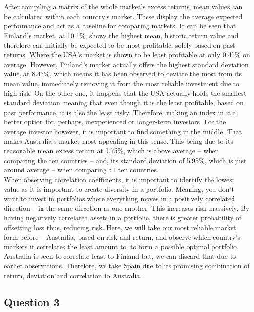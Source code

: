 \documentclass[11pt, english]{article}
\begin{document}
	After compiling a matrix of the whole market's excess returns, mean values can be calculated within each country's market. These display the average expected performance and act as a baseline for comparing markets. It can be seen that Finland's market, at 10.1\%, shows the highest mean, historic return value and therefore can initially be expected to be most profitable, solely based on past returns. Where the USA's market is shown to be least profitable at only 0.47\% on average. However, Finland's market actually offers the highest standard deviation value, at 8.47\%, which means it has been observed to deviate the most from its mean value, immediately removing it from the most reliable investment due to high risk. On the other end, it happens that the USA actually holds the smallest standard deviation meaning that even though it is the least profitable, based on past performance, it is also the least risky. Therefore, making an index in it a better option for, perhaps, inexperienced or longer-term investors. For the average investor however, it is important to find something in the middle. That makes Australia's market most appealing in this sense. This being due to its reasonable mean excess return at 0.75\%, which is above average – when comparing the ten countries – and, its standard deviation of 5.95\%, which is just around average – when comparing all ten countries.\\

	When observing correlation coefficients, it is important to identify the lowest value as it is important to create diversity in a portfolio. Meaning, you don't want to invest in portfolios where everything moves in a positively correlated direction – in the same direction as one another. This increases risk massively. By having negatively correlated assets in a portfolio, there is greater probability of offsetting loss thus, reducing risk. Here, we will take our most reliable market form before – Australia, based on risk and return, and observe which country's markets it correlates the least amount to, to form a possible optimal portfolio. Australia is seen to correlate least to Finland but, we can discard that due to earlier observations. Therefore, we take Spain due to its promising combination of return, deviation and correlation to Australia.

\newpage

	\subsection{Question 3}
\end{document}
